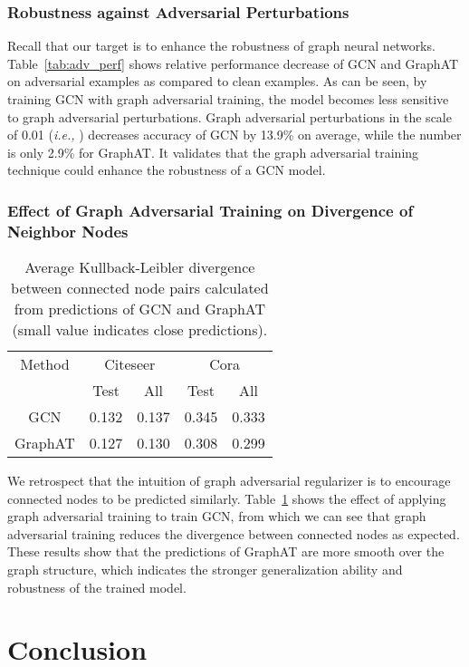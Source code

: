 \documentclass[10pt,journal,compsoc]{IEEEtran}
\newcommand{\ie}{\emph{i.e., }}
\begin{document}
\subsubsection{Robustness against Adversarial Perturbations}
Recall that our target is to enhance the robustness of graph neural networks. Table~\ref{tab:adv_perf} shows relative performance decrease of GCN and GraphAT on adversarial examples as compared to clean examples. As can be seen, by training GCN with graph adversarial training, the model becomes less sensitive to graph adversarial perturbations. Graph adversarial perturbations in the scale of 0.01 (\ie ) decreases accuracy of GCN by 13.9\% on average, while the number is only 2.9\% for GraphAT. It validates that the graph adversarial training technique could enhance the robustness of a GCN model.

\subsubsection{Effect of Graph Adversarial Training on Divergence of Neighbor Nodes}
\begin{table}[]
    \centering
	\caption{Average Kullback-Leibler divergence between connected node pairs calculated from predictions of GCN and GraphAT (small value indicates close predictions).}
	\vspace{-0.2cm}
	\label{tab:kld}
\begin{tabular}{c|cccc}
			\hline
			Method & \multicolumn{2}{c}{Citeseer} & \multicolumn{2}{c}{Cora} \\ 
			& Test         & All         & Test       & All        \\ \hline \hline
			GCN & 0.132 & 0.137 & 0.345 & 0.333 \\
			GraphAT & 0.127 & 0.130 & 0.308 & 0.299 \\ \hline
\end{tabular}\end{table}
We retrospect that the intuition of graph adversarial regularizer is to encourage connected nodes to be predicted similarly. Table~\ref{tab:kld} shows the effect of applying graph adversarial training to train GCN, from which we can see that graph adversarial training reduces the divergence between connected nodes as expected. These results show that the predictions of GraphAT are more smooth over the graph structure, which indicates the stronger generalization ability and robustness of the trained model. \section{Conclusion}
\end{document}
